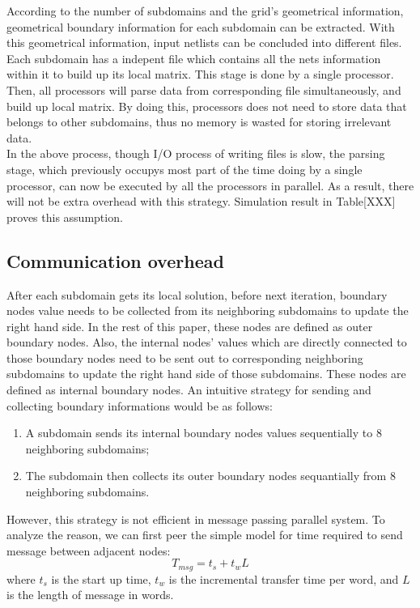 \documentclass{sig-alternate}
\begin{document}
	According to the number of subdomains and the grid's geometrical information, geometrical boundary information for each
	subdomain can be extracted. With this geometrical information, input netlists can be concluded into different files.
	Each subdomain has a indepent file which contains all the nets information within it to build up its local matrix. 
	This stage is done by a single processor. Then, all processors will parse data from corresponding file simultaneously, and build 
	up local matrix. By doing this, processors does not need to store data that belongs to other subdomains, thus no memory is 
	wasted for storing irrelevant data. \\

	In the above process, though I/O process of writing files is slow, the parsing stage, which previously occupys most part of the 
	time doing by a single processor, can now be executed by all the processors in parallel. As a result, there will not be extra
	overhead with this strategy. Simulation result in Table[XXX] proves this assumption.\\
	 
       \subsection{Communication overhead}
	After each subdomain gets its local solution, before next iteration, boundary nodes value needs to be collected from its 
	neighboring subdomains to update
	the right hand side. In the rest of this paper, these nodes are defined as outer boundary nodes. Also, the internal nodes' 
	values which are directly connected to those boundary nodes need to be sent out
	to corresponding neighboring subdomains to update the right hand side of those subdomains. These nodes are defined as internal
	boundary nodes. An intuitive strategy for sending and collecting boundary informations would be as follows:\\

	\begin{enumerate}[1.]
	  \item A subdomain sends its internal boundary nodes values sequentially to 8 neighboring subdomains;
	  \item The subdomain  then collects its outer boundary nodes sequantially from 8 neighboring subdomains.\\
	\end{enumerate}
	
 	However, this strategy is not efficient in message passing parallel system. To analyze the reason, we can first peer the simple
	model for time required to send message between adjacent nodes:
	\begin{equation}
		T_{msg} = t_s + t_wL\label{eq_msg}
	\end{equation}
	where $t_s$ is the start up time, $t_w$ is the incremental transfer time per word, and $L$ is the length of message in words.\\
	
\end{document}
